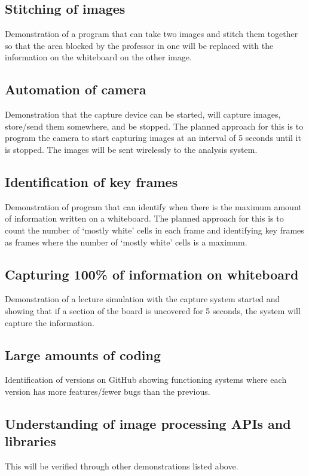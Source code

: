 \documentclass[]{article}
\begin{document}
		\subsection{Stitching of images}
			Demonstration of a program that can take two images and stitch them together so that the area blocked by the professor in one will be replaced with the information on the whiteboard on the other image.
			
		\subsection{Automation of camera}
			Demonstration that the capture device can be started, will capture images, store/send them somewhere, and be stopped. The planned approach for this is to program the camera to start capturing images at an interval of 5 seconds until it is stopped. The images will be sent wirelessly to the analysis system.
			
		\subsection{Identification of key frames}
			Demonstration of program that can identify when there is the maximum amount of information written on a whiteboard. The planned approach for this is to count the number of `mostly white' cells in each frame and identifying key frames as frames where the number of `mostly white' cells is a maximum.
			
		\subsection{Capturing 100\% of information on whiteboard}
			Demonstration of a lecture simulation with the capture system started and showing that if a section of the board is uncovered for 5 seconds, the system will capture the information.
			
		\subsection{Large amounts of coding}
			Identification of versions on GitHub showing functioning systems where each version has more features/fewer bugs than the previous.
			
		\subsection{Understanding of image processing APIs and libraries}
			This will be verified through other demonstrations listed above.
			
\end{document}
